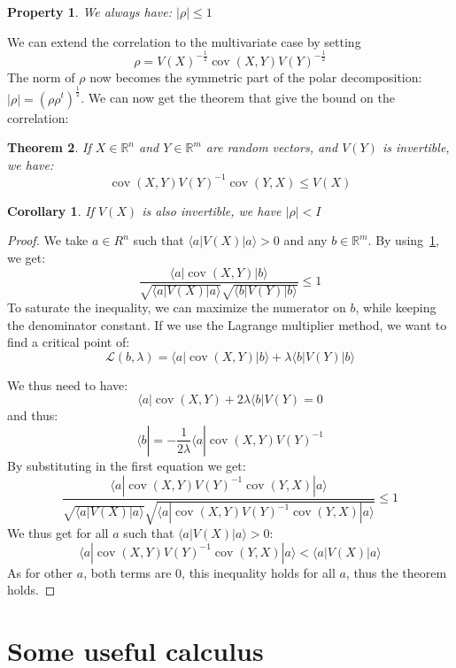 \documentclass[10pt,a4paper]{report}
\theoremstyle{plain}
\newtheorem{thm}{Theorem}[chapter]
\newtheorem{prop}[thm]{Property}
\newtheorem{cor}{Corollary}[thm]
\theoremstyle{definition}
\theoremstyle{remark}
\newcommand{\R}{\ensuremath{\mathbb{R}}}
\newcommand{\ket}[1]{|#1\rangle}
\newcommand{\bra}[1]{\langle#1|}
\renewcommand{\leq}{\leqslant}
\DeclareMathOperator{\cov}{cov}
\begin{document}
\begin{prop}\label{prop:correl1}
  We always have: $|\rho| \le 1$
\end{prop}

We can extend the correlation to the multivariate case by setting
\[\rho = {V(X)}^{-\frac12}\cov(X,Y){V(Y)}^{-\frac12}\]
The norm of $\rho$ now becomes the symmetric part of the polar decomposition:  $|\rho|
= {(\rho\rho^t)}^{\frac12}$. We can now get the theorem that give the bound on the
correlation:

\begin{thm}\label{thm:correln}
  If $X \in \R^n$ and $Y \in \R^m$ are random vectors, and $V(Y)$ is invertible,
  we have:
  \[\cov(X,Y){V(Y)}^{-1}\cov(Y,X) \leq V(X)\]
\end{thm}

\begin{cor}
  If $V(X)$ is also invertible, we have $|\rho| < I$
\end{cor}

\begin{proof}
  We take $a \in R^n$ such that $\bra a V(X) \ket a > 0$ and any $b \in \R^m$.
  By using~\cref{prop:correl1}, we get:
  \[ \frac{ \bra a \cov(X,Y) \ket b}{\sqrt{\bra a V(X) \ket a}\sqrt{\bra b V(Y)
        \ket b}} \leq 1\]
  To saturate the inequality, we can maximize the numerator on $b$, while keeping the
  denominator constant. If we use the Lagrange multiplier method, we want to
  find a critical point of:
  \[\mathcal{L}(b,\lambda) = \bra a \cov(X,Y) \ket b + \lambda \bra b V(Y) \ket
    b\]

  We thus need to have:
  \[ \bra a \cov(X,Y) + 2\lambda\bra b V(Y) = 0\]
  and thus:
  \[ \bra b = - \frac 1 {2\lambda} \bra a \cov(X,Y) {V(Y)}^{-1}\]
  By substituting in the first equation we get:
  \[ \frac{ \bra a \cov(X,Y) {V(Y)}^{-1} \cov(Y,X) \ket a}
    {\sqrt{\bra a V(X) \ket a}
      \sqrt{\bra a \cov(X,Y) {V(Y)}^{-1} \cov(Y,X) \ket a}} \leq 1\]
  We thus get for all $a$ such that $\bra a V(X) \ket a > 0$:
  \[ \bra a \cov(X,Y) {V(Y)}^{-1} \cov(Y,X) \ket a < \bra a V(X) \ket a\]
  As for other $a$, both terms are 0, this inequality holds for all $a$, thus
  the theorem holds.
\end{proof}




\chapter{Some useful calculus}
\end{document}
